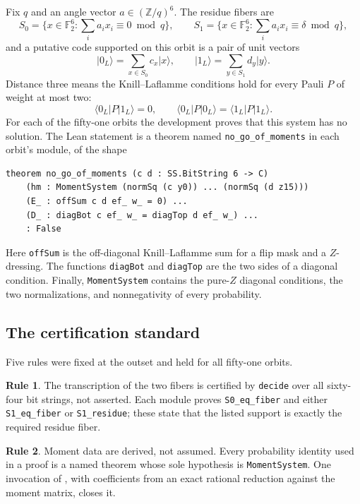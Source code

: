 \documentclass[11pt,a4paper]{article}
\providecommand{\ket}[1]{\lvert #1 \rangle}
\providecommand{\bra}[1]{\langle #1 \rvert}
\newcommand{\Sz}{S_0}
\newcommand{\So}{S_1}
\newcommand{\FF}{\mathbb{F}}
\newcommand{\lean}[1]{\texttt{#1}}
\theoremstyle{definition}
\newtheorem{standard}{Rule}
\begin{document}
Fix $q$ and an angle vector $a \in (\mathbb{Z}/q)^6$. The residue fibers are
\[
  \Sz = \{x \in \FF_2^6 : \textstyle\sum_i a_i x_i \equiv 0 \bmod q\},
  \qquad
  \So = \{x \in \FF_2^6 : \textstyle\sum_i a_i x_i \equiv \delta \bmod q\},
\]
and a putative code supported on this orbit is a pair of unit vectors
\[
  \ket{0_L} = \sum_{x \in \Sz} c_x \ket{x},
  \qquad
  \ket{1_L} = \sum_{y \in \So} d_y \ket{y}.
\]
Distance three means the Knill--Laflamme conditions hold for every Pauli $P$ of
weight at most two:
\[
  \bra{0_L} P \ket{1_L} = 0,
  \qquad
  \bra{0_L} P \ket{0_L} = \bra{1_L} P \ket{1_L}.
\]
For each of the fifty-one orbits the development proves that this system has
no solution. The Lean statement is a theorem named
\lean{no\_go\_of\_moments} in each orbit's module, of the shape
\begin{lstlisting}
theorem no_go_of_moments (c d : SS.BitString 6 -> C)
    (hm : MomentSystem (normSq (c y0)) ... (normSq (d z15)))
    (E_ : offSum c d ef_ w_ = 0) ...
    (D_ : diagBot c ef_ w_ = diagTop d ef_ w_) ...
    : False
\end{lstlisting}
Here \lean{offSum} is the off-diagonal Knill--Laflamme sum for a flip mask and a
$Z$-dressing. The functions \lean{diagBot} and \lean{diagTop} are the two sides
of a diagonal condition. Finally, \lean{MomentSystem} contains the pure-$Z$
diagonal conditions, the two normalizations, and nonnegativity of every
probability.

\subsection{The certification standard}
\label{sec:standard}

Five rules were fixed at the outset and held for all fifty-one orbits.

\begin{standard}
The transcription of the two fibers is certified by \lean{decide} over all
sixty-four bit strings, not asserted. Each module proves
\lean{S0\_eq\_fiber} and either \lean{S1\_eq\_fiber} or
\lean{S1\_residue}; these state that the listed support is exactly the required
residue fiber.
\end{standard}

\begin{standard}
Moment data are derived, not assumed. Every probability identity used in a proof
is a named theorem whose sole hypothesis is \lean{MomentSystem}. One invocation
of , with coefficients from an exact rational reduction
against the moment matrix, closes it.
\end{standard}
\end{document}
